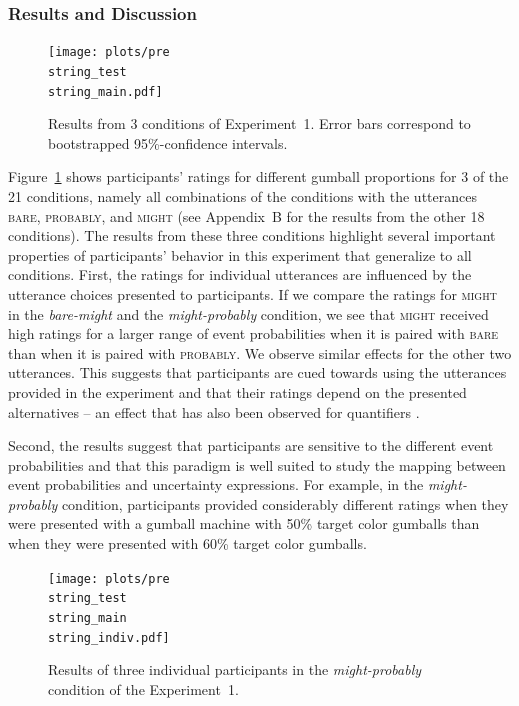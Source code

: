 \documentclass[man, floatsintext]{apa6}
\begin{document}
\subsubsection{Results and Discussion}

\begin{figure}
\texttt{[image: plots/pre\\string\_test\\string\_main.pdf]} 
\caption{Results from 3 conditions of Experiment~1. Error bars correspond to bootstrapped 95\%-confidence intervals. \label{fig:norming-results-main} }
\end{figure}

Figure~\ref{fig:norming-results-main} shows participants' ratings for different gumball proportions for 3 of the 21 conditions, namely all combinations of the conditions
with the utterances \textsc{bare}, \textsc{probably}, and \textsc{might} (see Appendix~B for the results from the other 18 conditions). 
The results from these three conditions highlight several important properties of participants'
behavior in this experiment that generalize to all conditions.
First, the ratings for individual utterances are influenced by the utterance choices presented to participants.
If we compare the ratings for \textsc{might} in the \textit{bare-might} and the \textit{might-probably} condition, we see that \textsc{might} received high ratings for a larger
range of event probabilities when it is paired with \textsc{bare} than when it is paired with \textsc{probably}. We observe similar effects for the other two utterances.
This suggests that participants are cued towards using the utterances provided in the experiment and that their ratings depend on the presented alternatives -- an effect that
has also been observed for quantifiers \parencite{Degen2016}.

Second, the results suggest that participants are sensitive to the different event probabilities and that this paradigm is well suited to study 
the mapping between event probabilities and uncertainty expressions. For example, in the \textit{might-probably} condition, participants
provided considerably different ratings when they were presented with a gumball machine with 50\% target color gumballs than when they
were presented with 60\% target color gumballs.

\begin{figure}
\texttt{[image: plots/pre\\string\_test\\string\_main\\string\_indiv.pdf]}
\caption{Results of three individual participants in the \emph{might-probably} condition of the Experiment~1. \label{fig:norming-results-indiv}}
\end{figure}
\end{document}

